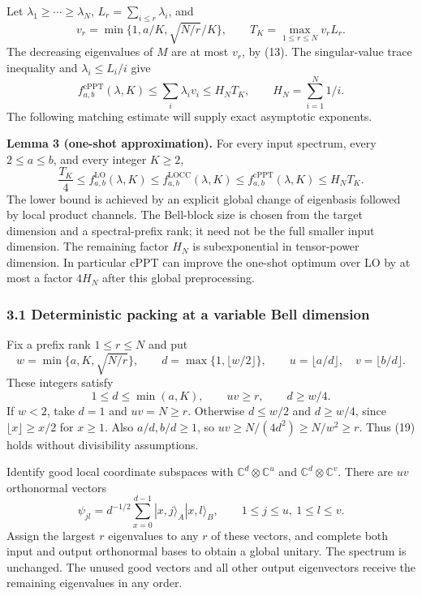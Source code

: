 \documentclass[11pt]{article}
\begin{document}
Let \(\lambda_1\ge\cdots\ge\lambda_N\), \(L_r=\sum_{i\le r}\lambda_i\), and \[
 v_r=\min\{1,a/K,\sqrt{N/r}/K\},\qquad T_K=\max_{1\le r\le N}v_rL_r.
 \tag{15}
\] The decreasing eigenvalues of \(M\) are at most \(v_r\), by (13). The singular-value trace inequality and \(\lambda_i\le L_i/i\) give \[
 f_{a,b}^{\mathrm{cPPT}}(\lambda,K)\le\sum_i\lambda_i v_i\le H_N T_K,
 \qquad H_N=\sum_{i=1}^N1/i.
 \tag{16}
\] The following matching estimate will supply exact asymptotic exponents.

\textbf{Lemma 3 (one-shot approximation).} For every input spectrum, every \(2\le a\le b\), and every integer \(K\ge2\), \[
 \frac{T_K}{4}\le f_{a,b}^{\mathrm{LO}}(\lambda,K)\le f_{a,b}^{\mathrm{LOCC}}(\lambda,K)\le f_{a,b}^{\mathrm{cPPT}}(\lambda,K)\le H_NT_K.
 \tag{17}
\] The lower bound is achieved by an explicit global change of eigenbasis followed by local product channels. The Bell-block size is chosen from the target dimension and a spectral-prefix rank; it need not be the full smaller input dimension. The remaining factor \(H_N\) is subexponential in tensor-power dimension. In particular cPPT can improve the one-shot optimum over LO by at most a factor \(4H_N\) after this global preprocessing.

\hypertarget{deterministic-packing-at-a-variable-bell-dimension}{%
\subsubsection{3.1 Deterministic packing at a variable Bell dimension}\label{deterministic-packing-at-a-variable-bell-dimension}}

Fix a prefix rank \(1\le r\le N\) and put \[
 w=\min\{a,K,\sqrt{N/r}\},\qquad
 d=\max\{1,\lfloor w/2\rfloor\},\qquad
 u=\lfloor a/d\rfloor,\quad v=\lfloor b/d\rfloor.
 \tag{18}
\] These integers satisfy \[
 1\le d\le\min(a,K),\qquad uv\ge r,\qquad d\ge w/4.
 \tag{19}
\] If \(w<2\), take \(d=1\) and \(uv=N\ge r\). Otherwise \(d\le w/2\) and \(d\ge w/4\), since \(\lfloor x\rfloor\ge x/2\) for \(x\ge1\). Also \(a/d,b/d\ge1\), so \(uv\ge N/(4d^2)\ge N/w^2\ge r\). Thus (19) holds without divisibility assumptions.

Identify good local coordinate subspaces with \(\mathbb C^d\otimes\mathbb C^u\) and \(\mathbb C^d\otimes\mathbb C^v\). There are \(uv\) orthonormal vectors \[
 \psi_{jl}=d^{-1/2}\sum_{x=0}^{d-1}|x,j\rangle_A|x,l\rangle_B,
 \qquad 1\le j\le u,\ 1\le l\le v.
 \tag{20}
\] Assign the largest \(r\) eigenvalues to any \(r\) of these vectors, and complete both input and output orthonormal bases to obtain a global unitary. The spectrum is unchanged. The unused good vectors and all other output eigenvectors receive the remaining eigenvalues in any order.
\end{document}
